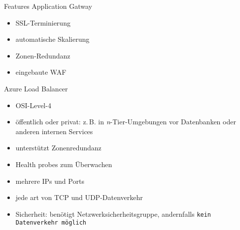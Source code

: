 \begin{flashcard}[]{Features Application Gatway}
  \begin{itemize}
    \item SSL-Terminierung
    \item automatische Skalierung
    \item Zonen-Redundanz
    \item eingebaute WAF
  \end{itemize}
\end{flashcard}

\begin{flashcard}[]{Azure Load Balancer}
  \begin{itemize}
    \item OSI-Level-4
    \item öffentlich oder privat: z.\,B. in \textit{n}-Tier-Umgebungen\newline
      vor Datenbanken oder anderen internen Services
    \item unterstützt Zonenredundanz
    \item Health probes zum Überwachen
    \item mehrere IPs und Ports
    \item jede art von TCP und UDP-Datenverkehr
    \item Sicherheit: benötigt Netzwerksicherheitsgruppe, andernfalls\newline
      \texttt{kein Datenverkehr möglich}
  \end{itemize}
\end{flashcard}
